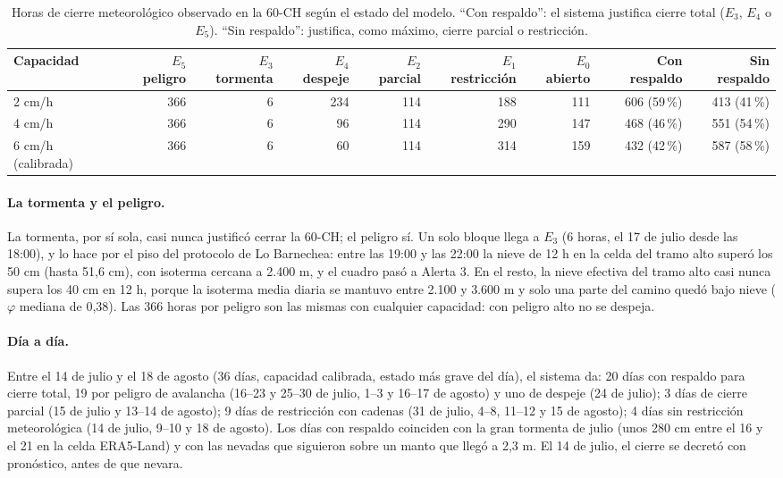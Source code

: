 \begin{table}[H]
\centering\footnotesize\setlength{\tabcolsep}{4pt}
\caption{Horas de cierre meteorológico observado en la 60-CH según el estado del modelo. ``Con respaldo'': el sistema justifica cierre total ($E_3$, $E_4$ o $E_5$). ``Sin respaldo'': justifica, como máximo, cierre parcial o restricción.}
\label{tab:contrafactual}
\begin{tabular}{|l|r|r|r|r|r|r|r|r|}
\hline
Capacidad & $E_5$ peligro & $E_3$ tormenta & $E_4$ despeje & $E_2$ parcial & $E_1$ restricción & $E_0$ abierto & Con respaldo & Sin respaldo \\ \hline
2 cm/h & 366 & 6 & 234 & 114 & 188 & 111 & 606 (59\,\%) & 413 (41\,\%) \\ \hline
4 cm/h & 366 & 6 & 96 & 114 & 290 & 147 & 468 (46\,\%) & 551 (54\,\%) \\ \hline
6 cm/h (calibrada) & 366 & 6 & 60 & 114 & 314 & 159 & 432 (42\,\%) & 587 (58\,\%) \\ \hline
\end{tabular}
\end{table}

\paragraph{La tormenta y el peligro.} La tormenta, por sí sola, casi nunca justificó cerrar la 60-CH; el peligro sí. Un solo bloque llega a $E_3$ (6 horas, el 17 de julio desde las 18:00), y lo hace por el piso del protocolo de Lo Barnechea: entre las 19:00 y las 22:00 la nieve de 12 h en la celda del tramo alto superó los 50 cm (hasta 51,6 cm), con isoterma cercana a 2.400 m, y el cuadro pasó a Alerta 3. En el resto, la nieve efectiva del tramo alto casi nunca supera los 40 cm en 12 h, porque la isoterma media diaria se mantuvo entre 2.100 y 3.600 m y solo una parte del camino quedó bajo nieve ($\varphi$ mediana de 0,38). Las 366 horas por peligro son las mismas con cualquier capacidad: con peligro alto no se despeja.

\paragraph{Día a día.} Entre el 14 de julio y el 18 de agosto (36 días, capacidad calibrada, estado más grave del día), el sistema da: 20 días con respaldo para cierre total, 19 por peligro de avalancha (16--23 y 25--30 de julio, 1--3 y 16--17 de agosto) y uno de despeje (24 de julio); 3 días de cierre parcial (15 de julio y 13--14 de agosto); 9 días de restricción con cadenas (31 de julio, 4--8, 11--12 y 15 de agosto); 4 días sin restricción meteorológica (14 de julio, 9--10 y 18 de agosto). Los días con respaldo coinciden con la gran tormenta de julio (unos 280 cm entre el 16 y el 21 en la celda ERA5-Land) y con las nevadas que siguieron sobre un manto que llegó a 2,3 m. El 14 de julio, el cierre se decretó con pronóstico, antes de que nevara.

